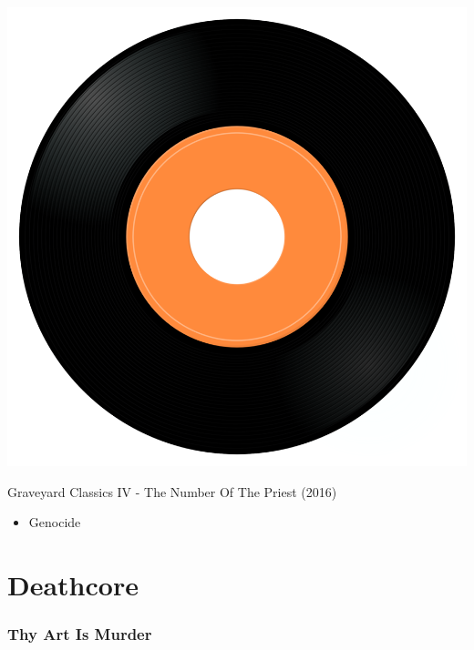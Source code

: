 \begin{minipage}[t]{0.25\textwidth}\vspace{0pt}
\captionsetup{type=figure}
\includegraphics[width=\textwidth]{Images/cover.png}
\caption*{Graveyard Classics IV - The Number Of The Priest (2016)}
\end{minipage}
\begin{minipage}[t]{0.25\textwidth}\vspace{0pt}
\begin{itemize}[nosep,leftmargin=1em,labelwidth=*,align=left]
	\setlength{\itemsep}{0pt}
	\item Genocide
\end{itemize}
\end{minipage}

\cleardoublepage
\section{Deathcore}

\subsubsection{Thy Art Is Murder}

